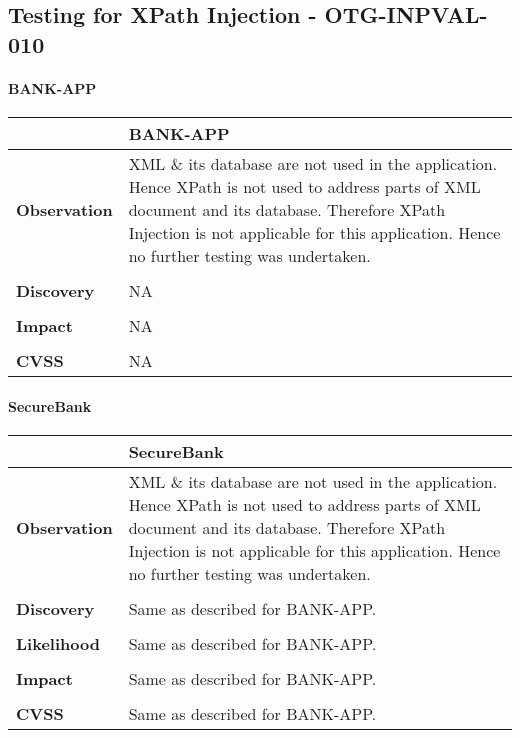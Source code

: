 \subsection{Testing for XPath Injection - OTG-INPVAL-010}
\paragraph{BANK-APP} \mbox{}
\begin{longtable*}{p{.20\textwidth} | p{.80\textwidth}}
    \hline
    & \textbf{BANK-APP} \\
    \hline
    \textbf{Observation} &
      XML \& its database are not used in the application. Hence XPath is not used to address parts of XML document and its database. Therefore XPath Injection is not applicable for this application. Hence no further testing was undertaken.
    \\\\
    \textbf{Discovery} &
        NA
    \\\\
    \textbf{Impact} &
        NA
    \\\\
    \textbf{CVSS} &
       NA
    \\
    \hline
\end{longtable*}
\paragraph{SecureBank} \mbox{}
\begin{longtable*}{p{.20\textwidth} | p{.80\textwidth}}
    \hline
    & \textbf{SecureBank} \\
    \hline
    \textbf{Observation} &
        XML \& its database are not used in the application. Hence XPath is not used to address parts of XML document and its database. Therefore XPath Injection is not applicable for this application. Hence no further testing was undertaken.
    \\\\
    \textbf{Discovery} &
	Same as described for BANK-APP.
    \\\\
    \textbf{Likelihood} &
        Same as described for BANK-APP.
    \\\\
    \textbf{Impact} &
        Same as described for BANK-APP.
    \\\\
    \textbf{CVSS} &
        Same as described for BANK-APP.
    \\
    \hline
\end{longtable*}
\clearpage